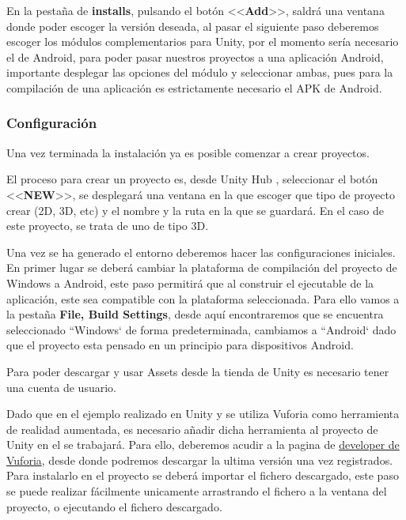 En la pestaña de \textbf{installs}, pulsando el botón <<\textbf{Add}>>, saldrá una ventana donde poder escoger la versión deseada, al pasar el siguiente paso deberemos escoger los módulos complementarios para Unity, por el momento sería necesario el de Android, para poder pasar nuestros proyectos a una aplicación Android, importante desplegar las opciones del módulo y seleccionar ambas, pues para la compilación de una aplicación es estrictamente necesario el APK de Android.



\label{sub:Confi}\subsubsection{Configuración }

Una vez terminada la instalación ya es posible comenzar a crear proyectos. 

El proceso para crear un proyecto es, desde Unity Hub , seleccionar el botón <<\textbf{NEW}>>, se desplegará una ventana en la que escoger que tipo de proyecto crear (2D, 3D, etc) y  el nombre y la ruta en la que se guardará. En el caso de este proyecto, se trata de uno de tipo 3D.

Una vez se ha generado el entorno deberemos hacer las configuraciones iniciales. En primer lugar se deberá cambiar la plataforma de compilación del proyecto de Windows a Android, este paso permitirá que al construir el ejecutable de la aplicación, este sea compatible con la plataforma seleccionada. 
Para ello vamos a la pestaña \textbf{File, Build Settings}, desde aquí encontraremos que se encuentra seleccionado ``Windows` de forma predeterminada, cambiamos a ``Android` dado que el proyecto esta pensado en un principio para dispositivos Android.

Para poder descargar y usar Assets desde la tienda de Unity es necesario tener una cuenta de usuario.

Dado que en el ejemplo realizado en Unity y se utiliza Vuforia como herramienta de realidad aumentada, es necesario añadir dicha herramienta al proyecto de Unity en el se trabajará. Para ello, deberemos acudir a la pagina de \href{https://developer.vuforia.com/downloads/sdk}{developer de Vuforia}, desde donde podremos descargar la ultima versión una vez registrados. Para instalarlo en el proyecto se deberá importar el fichero descargado, este paso se puede realizar fácilmente unicamente arrastrando el fichero a la ventana del proyecto, o ejecutando el fichero descargado.

